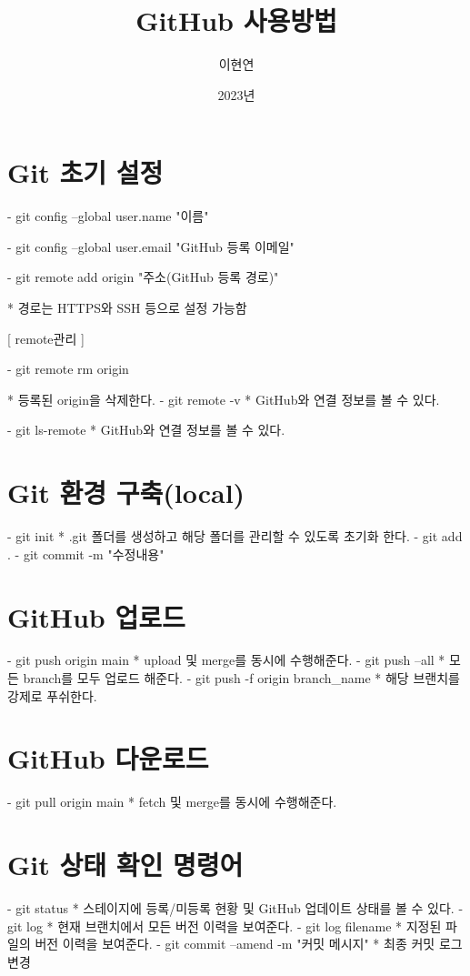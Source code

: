 \documentclass[12pt,a4paper,twoside, footnote]{oblivoir}
\title{GitHub 사용방법}
\author{이현연}
\date{2023년}
\begin{document}
\maketitle

\section[Git 초기 설정]{Git 초기 설정}
- git config --global user.name "이름"

- git config --global user.email "GitHub 등록 이메일"

- git remote add origin "주소(GitHub 등록 경로)"

* 경로는 HTTPS와 SSH 등으로 설정 가능함

[ remote관리 ]

- git remote rm origin

 * 등록된 origin을 삭제한다.
- git remote -v 
 * GitHub와 연결 정보를 볼 수 있다.
    
- git ls-remote
 * GitHub와 연결 정보를 볼 수 있다.
 
\section[Git 환경 구축(local)]{Git 환경 구축(local)}
  - git init 
    * .git 폴더를 생성하고 해당 폴더를 관리할 수 있도록 초기화 한다.
  - git add .
  - git commit -m "수정내용"

\section[GitHub 업로드]{GitHub 업로드}
  - git push origin main
    * upload 및 merge를 동시에 수행해준다.
  - git push --all
    * 모든 branch를 모두 업로드 해준다.
  - git push -f origin branch_name
    * 해당 브랜치를 강제로 푸쉬한다.

\section[GitHub 다운로드]{GitHub 다운로드}
  - git pull origin main
    * fetch 및 merge를 동시에 수행해준다.

\section[Git 상태 확인 명령어]{Git 상태 확인 명령어}
  - git status
    * 스테이지에 등록/미등록 현황 및 GitHub 업데이트 상태를 볼 수 있다.
  - git log
    * 현재 브랜치에서 모든 버전 이력을 보여준다.
  - git log filename
    * 지정된 파일의 버전 이력을 보여준다.
  - git commit --amend -m "커밋 메시지"
    * 최종 커밋 로그 변경
\end{document}

